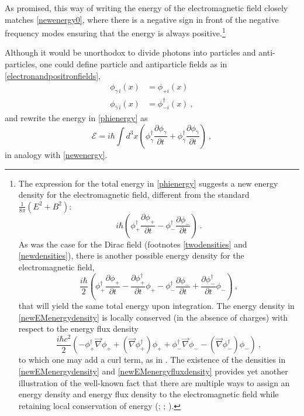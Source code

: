 \documentclass[onecolumn,secnumarabic,amsmath,amssymb,balancelastpage,nofootinbib]{article}
\newcommand{\del}[0]{\ensuremath{\vec{\nabla}}}
\begin{document}
As promised, this way of writing the energy of the electromagnetic field closely matches \eqref{newenergy0}, where there is a negative sign in front of the negative frequency modes ensuring that the energy is always positive.\footnote{The expression for the total energy in \eqref{phienergy} suggests a new energy density for the electromagnetic field, different from the standard $\frac{1}{8\pi}(E^2 + B^2)$:
\begin{equation}
i \hbar \left(\phi^{\dagger}_+ \frac{\partial\phi_+}{\partial t} - \phi^{\dagger}_- \frac{\partial \phi_-}{\partial t} \right)
\ .
\end{equation}
As was the case for the Dirac field (footnotes \ref{twodensities} and \ref{newdensities}), there is another possible energy density for the electromagnetic field,
\begin{equation}
\frac{i \hbar}{2} \left(\phi^{\dagger}_+ \frac{\partial\phi_+}{\partial t} -\frac{\partial\phi^{\dagger}_+}{\partial t} \phi_+ - \phi^{\dagger}_- \frac{\partial \phi_-}{\partial t} + \frac{\partial\phi^{\dagger}_-}{\partial t} \phi_-\right)
\ ,
\label{newEMenergydensity}
\end{equation}
that will yield the same total energy upon integration.  The energy density in \eqref{newEMenergydensity} is locally conserved (in the absence of charges) with respect to the energy flux density
\begin{equation}
\frac{i \hbar c^2}{2}\left(-\phi^{\dagger}_{+} \del \phi_{+} + (\del \phi^{\dagger}_{+}) \phi_{+}  + \phi^{\dagger}_{-} \del \phi_{-} - (\del \phi^{\dagger}_{-})\phi_{-} \right)
\label{newEMenergyfluxdensity}
\ ,
\end{equation}
to which one may add a curl term, as in \citet[eq.\ 13]{ohanian}.  The existence of the densities in \eqref{newEMenergydensity} and \eqref{newEMenergyfluxdensity} provides yet another illustration of the well-known fact that there are multiple ways to assign an energy density and energy flux density to the electromagnetic field while retaining local conservation of energy (\citealp[sec.\ 31-33]{landaulifshitzfields}; \citealp[sec.\ 6.7 and 12.10]{jackson}; \citealp[ch.\ 5]{lange}).}



Although it would be unorthodox to divide photons into particles and anti-particles, one could define particle and antiparticle fields as in \eqref{electronandpositronfields},
\begin{align}
\phi_{\gamma \, i}(x)&=\phi_{+ i}(x)
\nonumber
\\
\phi_{\bar{\gamma} \, i}(x)&=\phi^{\dagger}_{- i}(x)
\ ,
\end{align}
and rewrite the energy in \eqref{phienergy} as
\begin{equation}
\mathcal{E}=i \hbar \int{d^3 x \left( \phi_{\gamma}^{\dagger}\frac{\partial \phi_{\gamma}}{\partial t} + \phi_{\bar{\gamma}}^{\dagger}\frac{\partial \phi_{\bar{\gamma}}}{\partial t}\right)}
\ ,
\end{equation}
in analogy with \eqref{newenergy}.
\end{document}
